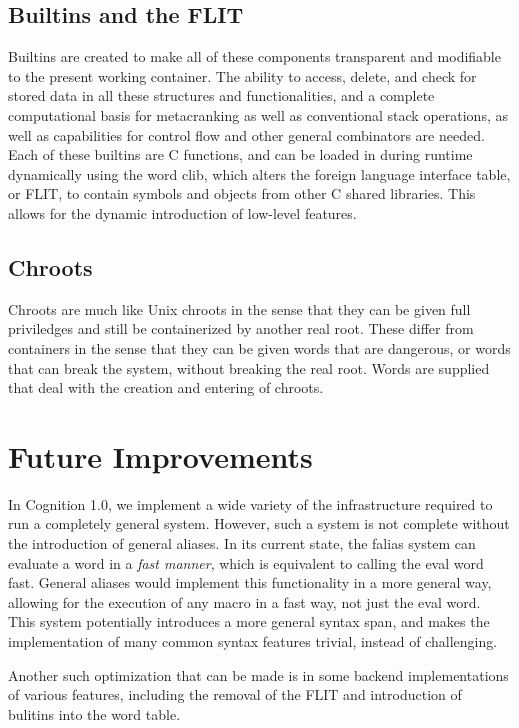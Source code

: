 \documentclass[
	letterpaper,
	10pt,
	twoside,
]{LTJournalArticle}
\begin{document}
\subsection{Builtins and the FLIT}
Builtins are created to make all of these components transparent and modifiable to the present working container. The ability
to access, delete, and check for stored data in all these structures and functionalities, and a complete computational basis
for metacranking as well as conventional stack operations, as well as capabilities for control flow and other general
combinators are needed. Each of these builtins are C functions, and can be loaded in during runtime dynamically using the word
clib, which alters the foreign language interface table, or FLIT, to contain symbols and objects from other C shared libraries.
This allows for the dynamic introduction of low-level features.
\subsection{Chroots}
Chroots are much like Unix chroots in the sense that they can be given full priviledges and still be containerized by another
real root. These differ from containers in the sense that they can be given words that are dangerous, or words that can break
the system, without breaking the real root. Words are supplied that deal with the creation and entering of chroots.

\section{Future Improvements}
In Cognition 1.0, we implement a wide variety of the infrastructure required to run a completely general system. However,
such a system is not complete without the introduction of general aliases. In its current state, the falias system can
evaluate a word in a \emph{fast manner}, which is equivalent to calling the eval word fast. General aliases would implement
this functionality in a more general way, allowing for the execution of any macro in a fast way, not just the eval word. This
system potentially introduces a more general syntax span, and makes the implementation of many common syntax features trivial,
instead of challenging.

Another such optimization that can be made is in some backend implementations of various features, including the removal
of the FLIT and introduction of bulitins into the word table.
\end{document}
